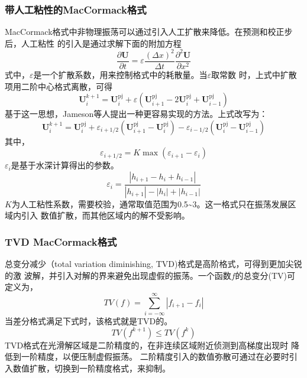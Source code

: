 \subsubsection{带人工粘性的MacCormack格式}
MacCormack格式中非物理振荡可以通过引入人工扩散来降低。在预测和校正步后，人工粘性
的引入是通过求解下面的附加方程
\begin{equation}
  \frac{\partial \mathbf{U}}{\partial t} =
  \varepsilon
  \frac{(\Delta x)^{2}}{\Delta t}
  \frac{{\partial}^{2}\mathbf{U}}{\partial x^{2}}
\end{equation}
式中，$\varepsilon$是一个扩散系数，用来控制格式中的耗散量。当$\varepsilon$取常数
时，上式中扩散项用二阶中心格式离散，可得
\begin{equation}
  \mathbf{U}_{i}^{k+1} =
  \mathbf{U}_{i}^{\mathrm{pj}} +
  \varepsilon
  (
  \mathbf{U}_{i+1}^{\mathrm{pj}} - 
  2\mathbf{U}_{i}^{\mathrm{pj}} +
  \mathbf{U}_{i-1}^{\mathrm{pj}}
  )
\end{equation}
基于这一思想，Jameson等人提出一种更容易实现的方法。上式改写为：
\begin{equation}
  \mathbf{U}_{i}^{k+1} =
  \mathbf{U}_{i}^{\mathrm{pj}} +
  {\varepsilon}_{i+1/2}
  (
  \mathbf{U}_{i+1}^{\mathrm{pj}} - 
  \mathbf{U}_{i}^{\mathrm{pj}}
  )
  -
  {\varepsilon}_{i-1/2}
  (
  \mathbf{U}_{i}^{\mathrm{pj}} -
  \mathbf{U}_{i-1}^{\mathrm{pj}}
  )
\end{equation}
其中，
\begin{equation}
  {\varepsilon}_{i+1/2} =
  K\max({\varepsilon}_{i+1}-{\varepsilon}_{i})
\end{equation}
${\varepsilon}_{i}$是基于水深计算得出的参数。
\begin{equation}
  {\varepsilon}_{i} =
  \frac{|h_{i+1}-h_{i}+h_{i-1}|}{|h_{i+1}|-|h_{i}|+|h_{i-1}|}
\end{equation}
$K$为人工粘性系数，需要校验，通常取值范围为0.5\textasciitilde 3。这一格式只在振荡发展区域内引入
数值扩散，而其他区域内的解不受影响。

\subsubsection{TVD MacCormack格式}
总变分减少（total variation diminishing, TVD)格式是高阶格式，可得到更加尖锐的激
波解，并引入对解的界来避免出现虚假的振荡。一个函数$f$的总变分(TV)可定义为，
\begin{equation}
  TV(f) =
  \sum_{i=-\infty}^{\infty}
  |{f}_{i+1} - {f}_{i}|
\end{equation}
当差分格式满足下式时，该格式就是TVD的。
\begin{equation}
  TV({f}^{k+1}) \le TV({f}^{k})
\end{equation}
TVD格式在光滑解区域是二阶精度的，在非连续区域附近侦测到高梯度出现时
降低到一阶精度，以便压制虚假振荡。
二阶精度引入的数值弥散可通过在必要时引入数值扩散，切换到一阶精度格式，来抑制。

